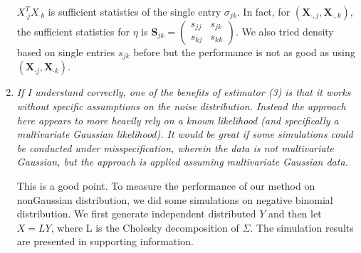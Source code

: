 \documentclass[12pt]{article}
\def\bs{\boldsymbol}
\begin{document}
\begin{enumerate}
$X_{\cdot j}^TX_{\cdot k}$ is sufficient statistics of the single entry $\sigma_{jk}$. In fact, for $(\bs{X}_{\cdot,j}, \bs{X}_{\cdot,k})$, the sufficient statistics for $\eta$ is $\bs{S}_{jk} = \begin{pmatrix} s_{jj}&s_{jk} \\  s_{kj}&s_{kk} \end{pmatrix}$. We also tried density based on single entries $s_{jk}$ before but the performance is not as good as using $(\bs{X}_{\cdot j},\bs{X}_{\cdot k})$.
\item \emph{If I understand correctly, one of the benefits of estimator (3) is that it works without specific assumptions on the noise distribution. Instead the approach here appears to more heavily rely on a known likelihood (and specifically a multivariate Gaussian likelihood). It would be great if some simulations could be conducted under misspecification, wherein the data is not multivariate Gaussian, but the approach is applied assuming multivariate Gaussian data.}

This is a good point. To measure the performance of our method on nonGaussian distribution, we did some simulations on negative binomial distribution. We first generate independent distributed $Y$ and then let $X = L Y$, where L is the Cholesky decomposition of $\Sigma$. The simulation results are presented in supporting information.
\end{enumerate}
\end{document}
